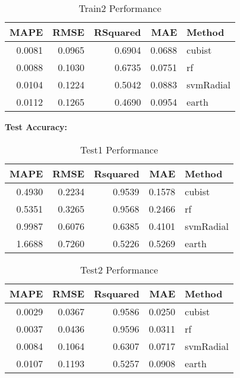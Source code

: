 \documentclass[]{report}
\begin{document}
\begin{table}[H]

\caption{\label{tab:unnamed-chunk-7}Train2 Performance}
\centering
\fontsize{8}{10}\selectfont
\begin{tabular}{rrrrl}
\toprule
MAPE & RMSE & RSquared & MAE & Method\\
\midrule
\rowcolor{gray!6}  0.0081 & 0.0965 & 0.6904 & 0.0688 & cubist\\
0.0088 & 0.1030 & 0.6735 & 0.0751 & rf\\
\rowcolor{gray!6}  0.0104 & 0.1224 & 0.5042 & 0.0883 & svmRadial\\
0.0112 & 0.1265 & 0.4690 & 0.0954 & earth\\
\bottomrule
\end{tabular}
\end{table}

\textbf{Test Accuracy:}

\begin{table}[H]

\caption{\label{tab:unnamed-chunk-8}Test1 Performance}
\centering
\fontsize{8}{10}\selectfont
\begin{tabular}{rrrrl}
\toprule
MAPE & RMSE & Rsquared & MAE & Method\\
\midrule
\rowcolor{gray!6}  0.4930 & 0.2234 & 0.9539 & 0.1578 & cubist\\
0.5351 & 0.3265 & 0.9568 & 0.2466 & rf\\
\rowcolor{gray!6}  0.9987 & 0.6076 & 0.6385 & 0.4101 & svmRadial\\
1.6688 & 0.7260 & 0.5226 & 0.5269 & earth\\
\bottomrule
\end{tabular}
\end{table}

\begin{table}[H]

\caption{\label{tab:unnamed-chunk-8}Test2 Performance}
\centering
\fontsize{8}{10}\selectfont
\begin{tabular}{rrrrl}
\toprule
MAPE & RMSE & Rsquared & MAE & Method\\
\midrule
\rowcolor{gray!6}  0.0029 & 0.0367 & 0.9586 & 0.0250 & cubist\\
0.0037 & 0.0436 & 0.9596 & 0.0311 & rf\\
\rowcolor{gray!6}  0.0084 & 0.1064 & 0.6307 & 0.0717 & svmRadial\\
0.0107 & 0.1193 & 0.5257 & 0.0908 & earth\\
\bottomrule
\end{tabular}
\end{table}
\end{document}
